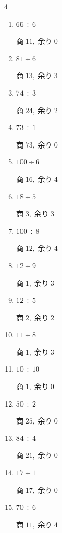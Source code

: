 \begin{multicols}{4}
\begin{enumerate}
  \item $66 \div 6$

        $商\; 11,\; 余り\; 0$

  \item $81 \div 6$

        $商\; 13,\; 余り\; 3$

  \item $74 \div 3$

        $商\; 24,\; 余り\; 2$

\columnbreak %

  \item $73 \div 1$

        $商\; 73,\; 余り\; 0$

  \item $100 \div 6$

        $商\; 16,\; 余り\; 4$

  \item $18 \div 5$

        $商\; 3,\; 余り\; 3$

  \item $100 \div 8$

        $商\; 12,\; 余り\; 4$

  \item $12 \div 9$

        $商\; 1,\; 余り\; 3$

  \item $12 \div 5$

        $商\; 2,\; 余り\; 2$

  \item $11 \div 8$

        $商\; 1,\; 余り\; 3$

  \item $10 \div 10$

        $商\; 1,\; 余り\; 0$

  \item $50 \div 2$

        $商\; 25,\; 余り\; 0$

  \item $84 \div 4$

        $商\; 21,\; 余り\; 0$

  \item $17 \div 1$

        $商\; 17,\; 余り\; 0$

  \item $70 \div 6$

        $商\; 11,\; 余り\; 4$


\end{enumerate}
\end{multicols}
